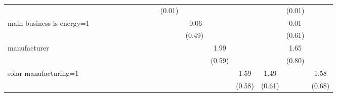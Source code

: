 \begin{table}[htbp]
\begin{tabular*}{0.8\hsize}{@{\hskip\tabcolsep\extracolsep\fill}l*{16}{c}}
                    &                     &                     &                     &                     &                     &                     &                     &                     &                     &      (0.01)         &                     &                     &                     &                     &      (0.01)         &                     \\
[1em]
main business is energy=1&                     &                     &                     &                     &                     &                     &                     &                     &                     &                     &       -0.06         &                     &                     &                     &        0.01         &                     \\
                    &                     &                     &                     &                     &                     &                     &                     &                     &                     &                     &      (0.49)         &                     &                     &                     &      (0.61)         &                     \\
[1em]
manufacturer        &                     &                     &                     &                     &                     &                     &                     &                     &                     &                     &                     &        1.99\sym{***}&                     &                     &        1.65\sym{**} &                     \\
                    &                     &                     &                     &                     &                     &                     &                     &                     &                     &                     &                     &      (0.59)         &                     &                     &      (0.80)         &                     \\
[1em]
solar manufacturing=1&                     &                     &                     &                     &                     &                     &                     &                     &                     &                     &                     &                     &        1.59\sym{***}&        1.49\sym{**} &                     &        1.58\sym{**} \\
                    &                     &                     &                     &                     &                     &                     &                     &                     &                     &                     &                     &                     &      (0.58)         &      (0.61)         &                     &      (0.68)         \\

\end{tabular*}
\end{table}
